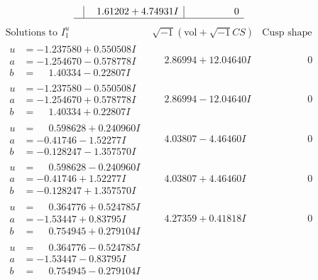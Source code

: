 \documentclass[1p]{elsarticle_modified}
\theoremstyle{definition}
\newcommand{\I}{\sqrt{-1}}
\begin{document}
$$\begin{array}{c|c|c}
 & \phantom{-}1.61202 + 4.74931 I & \phantom{-0.000000 } 0\\
 \hline 
 \end{array}$$\newpage$$\begin{array}{c|c|c}  
\text{Solutions to }I^u_{1}& \I (\text{vol} + \sqrt{-1}CS) & \text{Cusp shape}\\
 \hline 
\begin{aligned}
u &= -1.237580 + 0.550508 I \\
a &= -1.254670 - 0.578778 I \\
b &= \phantom{-}1.40334 - 0.22807 I\end{aligned}
 & \phantom{-}2.86994 + 12.04640 I & \phantom{-0.000000 } 0 \\ \hline\begin{aligned}
u &= -1.237580 - 0.550508 I \\
a &= -1.254670 + 0.578778 I \\
b &= \phantom{-}1.40334 + 0.22807 I\end{aligned}
 & \phantom{-}2.86994 - 12.04640 I & \phantom{-0.000000 } 0 \\ \hline\begin{aligned}
u &= \phantom{-}0.598628 + 0.240960 I \\
a &= -0.41746 - 1.52277 I \\
b &= -0.128247 - 1.357570 I\end{aligned}
 & \phantom{-}4.03807 - 4.46460 I & \phantom{-0.000000 } 0 \\ \hline\begin{aligned}
u &= \phantom{-}0.598628 - 0.240960 I \\
a &= -0.41746 + 1.52277 I \\
b &= -0.128247 + 1.357570 I\end{aligned}
 & \phantom{-}4.03807 + 4.46460 I & \phantom{-0.000000 } 0 \\ \hline\begin{aligned}
u &= \phantom{-}0.364776 + 0.524785 I \\
a &= -1.53447 + 0.83795 I \\
b &= \phantom{-}0.754945 + 0.279104 I\end{aligned}
 & \phantom{-}4.27359 + 0.41818 I & \phantom{-0.000000 } 0 \\ \hline\begin{aligned}
u &= \phantom{-}0.364776 - 0.524785 I \\
a &= -1.53447 - 0.83795 I \\
b &= \phantom{-}0.754945 - 0.279104 I\end{aligned}

\end{array}$$
\end{document}
